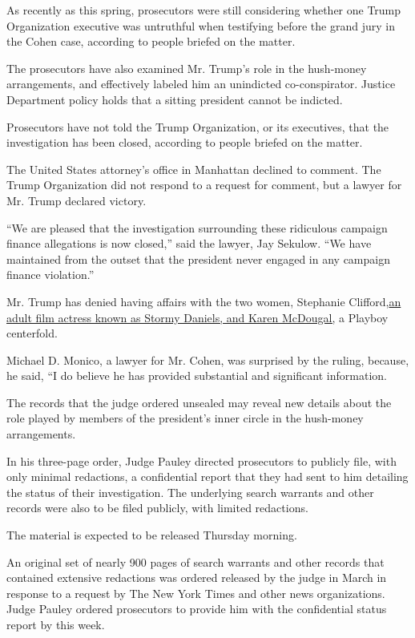 As recently as this spring, prosecutors were still considering whether
one Trump Organization executive was untruthful when testifying before
the grand jury in the Cohen case, according to people briefed on the
matter.

The prosecutors have also examined Mr. Trump's role in the hush-money
arrangements, and effectively labeled him an unindicted co-conspirator.
Justice Department policy holds that a sitting president cannot be
indicted.

Prosecutors have not told the Trump Organization, or its executives,
that the investigation has been closed, according to people briefed on
the matter.

The United States attorney's office in Manhattan declined to comment.
The Trump Organization did not respond to a request for comment, but a
lawyer for Mr. Trump declared victory.

``We are pleased that the investigation surrounding these ridiculous
campaign finance allegations is now closed,'' said the lawyer, Jay
Sekulow. ``We have maintained from the outset that the president never
engaged in any campaign finance violation.''

Mr. Trump has denied having affairs with the two women, Stephanie
Clifford,\href{https://www.nytimes3xbfgragh.onion/2018/05/04/us/politics/trump-hush-payment-stormy-daniels.html}{an
adult film actress known as Stormy Daniels, and Karen McDougal,} a
Playboy centerfold.

Michael D. Monico, a lawyer for Mr. Cohen, was surprised by the ruling,
because, he said, ``I do believe he has provided substantial and
significant information.

The records that the judge ordered unsealed may reveal new details about
the role played by members of the president's inner circle in the
hush-money arrangements.

In his three-page order, Judge Pauley directed prosecutors to publicly
file, with only minimal redactions, a confidential report that they had
sent to him detailing the status of their investigation. The underlying
search warrants and other records were also to be filed publicly, with
limited redactions.

The material is expected to be released Thursday morning.

An original set of nearly 900 pages of search warrants and other records
that contained extensive redactions was ordered released by the judge in
March in response to a request by The New York Times and other news
organizations. Judge Pauley ordered prosecutors to provide him with the
confidential status report by this week.

